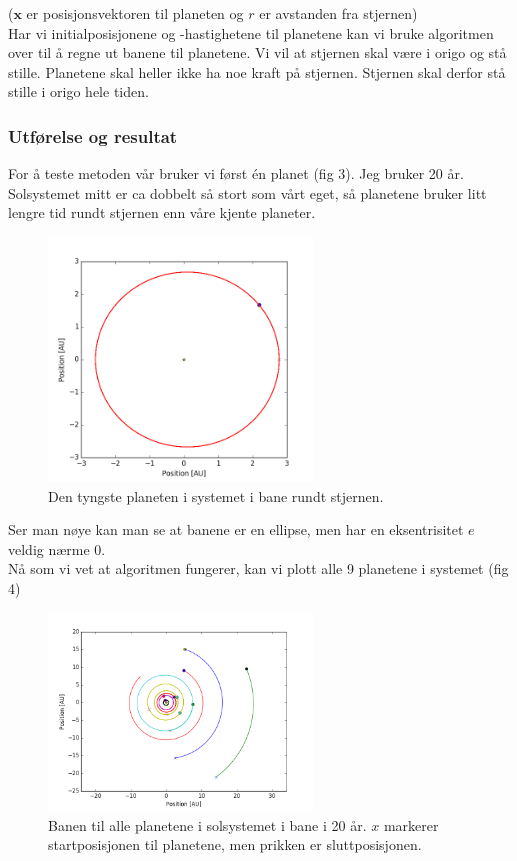 \documentclass[a4paper,norsk,11pt,twoside]{article}
\begin{document}
($\textbf{x}$ er posisjonsvektoren til planeten og $r$ er avstanden fra stjernen) \\

Har vi initialposisjonene og -hastighetene til planetene kan vi bruke algoritmen over til å regne ut banene til planetene. Vi vil at stjernen skal være i origo og stå stille. Planetene skal heller ikke ha noe kraft på stjernen. Stjernen skal derfor stå stille i origo hele tiden.

\subsubsection{Utførelse og resultat}

For å teste metoden vår bruker vi først én planet (fig 3). Jeg bruker 20 år. Solsystemet mitt er ca dobbelt så stort som vårt eget, så planetene bruker litt lengre tid rundt stjernen enn våre kjente planeter.

\begin{figure}[hbt]
\begin{center}
\includegraphics[width=70mm]{one_planet.png}
\caption{Den tyngste planeten i systemet i bane rundt stjernen.}\label{fig:finfigur}
\end{center}
\end{figure} 

Ser man nøye kan man se at banene er en ellipse, men har en eksentrisitet $e$ veldig nærme 0.\\

Nå som vi vet at algoritmen fungerer, kan vi plott alle 9 planetene i systemet (fig 4)

\begin{figure}[hbt]
\begin{center}
\includegraphics[width=70mm]{full_system.png}
\caption{Banen til alle planetene i solsystemet i bane i 20 år. $x$ markerer startposisjonen til planetene, men prikken er sluttposisjonen.}\label{fig:finfigur}
\end{center}
\end{figure}
\end{document}

